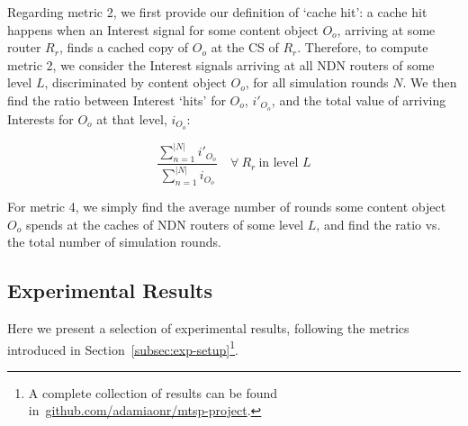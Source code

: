 Regarding metric 2, we first provide our definition of `cache hit': a cache hit 
happens when an Interest signal for some content object $O_o$, arriving at some 
router $R_r$, finds a cached copy of $O_o$ at the CS of $R_r$. Therefore, to 
compute metric 2, we consider the Interest signals 
arriving at all NDN routers of some level $L$, discriminated by content 
object $O_o$, for all simulation rounds $N$. We then find the ratio between Interest 
`hits' for $O_o$, $i'_{O_o}$, and the total value of arriving Interests for $O_o$ at that 
level, $i_{O_o}$:

\begin{equation}
    \frac{\sum_{n=1}^{|N|} i'_{O_o}}{\sum_{n=1}^{|N|} i_{O_o}} \quad \forall \ R_r \ \text{in level $L$}
    \label{eq:exp-setup-metrics-2}
\end{equation}\shortvertbreak

For metric 4, we simply find the average number of rounds 
some content object $O_o$ spends at the caches of NDN routers of some level $L$, and find 
the ratio vs. the total number of simulation rounds.

\subsection{Experimental Results}
\label{subsec:exp-results}

Here we present a selection of experimental results, following the metrics 
introduced in Section~\ref{subsec:exp-setup}\footnote{A complete collection of 
results can be found in~\url{github.com/adamiaonr/mtsp-project}.}.

